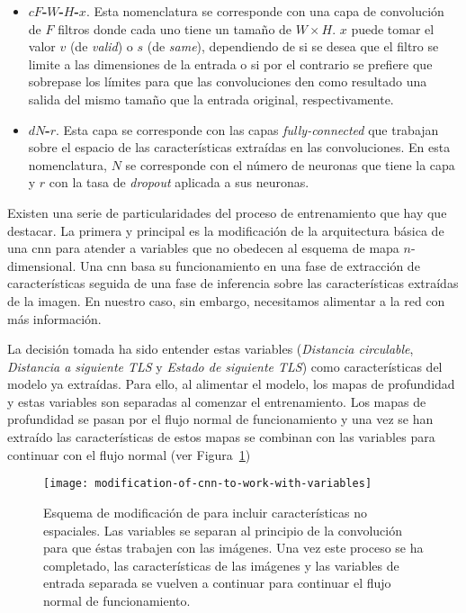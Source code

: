 \begin{itemize}
	\item \textbf{$cF$-$W$-$H$-$x$}. Esta nomenclatura se corresponde con una capa de convolución de $F$ filtros donde cada uno tiene un tamaño de $W \times H$. $x$ puede tomar el valor $v$ (de \textit{valid}) o $s$ (de \textit{same}), dependiendo de si se desea que el filtro se limite a las dimensiones de la entrada o si por el contrario se prefiere que sobrepase los límites para que las convoluciones den como resultado una salida del mismo tamaño que la entrada original, respectivamente.
	\item \textbf{$dN$-$r$}. Esta capa se corresponde con las capas \textit{fully-connected} que trabajan sobre el espacio de las características extraídas en las convoluciones. En esta nomenclatura, $N$ se corresponde con el número de neuronas que tiene la capa y $r$ con la tasa de \textit{dropout} aplicada a sus neuronas.
\end{itemize}

Existen una serie de particularidades del proceso de entrenamiento que hay que destacar. La primera y principal es la modificación de la arquitectura básica de una \ac{cnn} para atender a variables que no obedecen al esquema de mapa $n$-dimensional. Una \ac{cnn} basa su funcionamiento en una fase de extracción de características seguida de una fase de inferencia sobre las características extraídas de la imagen. En nuestro caso, sin embargo, necesitamos alimentar a la red con más información.

La decisión tomada ha sido entender estas variables (\textit{Distancia circulable}, \textit{Distancia a siguiente TLS} y \textit{Estado de siguiente TLS}) como características del modelo ya extraídas. Para ello, al alimentar el modelo, los mapas de profundidad y estas variables son separadas al comenzar el entrenamiento. Los mapas de profundidad se pasan por el flujo normal de funcionamiento y una vez se han extraído las características de estos mapas se combinan con las variables para continuar con el flujo normal (ver Figura~\ref{fig:modification-of-cnn-to-work-with-variables})

\begin{figure}
	\centering
	\texttt{[image: modification-of-cnn-to-work-with-variables]}
	\caption[Esquema de modificación de  para incluir características no espaciales]{Esquema de modificación de  para incluir características no espaciales. Las variables se separan al principio de la convolución para que éstas trabajen con las imágenes. Una vez este proceso se ha completado, las características de las imágenes y las variables de entrada separada se vuelven a continuar para continuar el flujo normal de funcionamiento.}
	\label{fig:modification-of-cnn-to-work-with-variables}
\end{figure}

